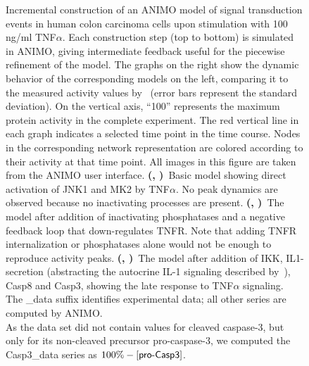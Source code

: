 \documentclass{bmcart}
\begin{document}
\begin{backmatter}
\begin{figure}[!bhtp]
\begin{tabular}{ll}
\end{tabular}
  \caption{
Incremental construction of an ANIMO model of signal transduction
events in human colon carcinoma cells upon stimulation with 100 ng/ml TNF$\alpha$.
Each construction step (top to bottom) is simulated in ANIMO, giving intermediate feedback
useful for the piecewise refinement of the model.
The graphs on the right show the dynamic behavior of the corresponding models on the left, comparing it to the measured
activity values by~\cite{pathway-compendium} (error bars represent the standard deviation).
On the vertical axis, ``100'' represents the maximum protein activity in the complete experiment.
The red vertical line in each graph indicates a selected time point in the time course. 
Nodes in the corresponding network representation are colored according to their activity at that time point.
All images in this figure are taken from the ANIMO user interface.
{\bf (\protect{}, \protect{})}~Basic model showing direct activation of JNK1 and MK2 by TNF$\alpha$.
No peak dynamics are observed because no inactivating processes are present.
{\bf (\protect{}, \protect{})}~The model after addition of inactivating phosphatases and a
negative feedback loop that down-regulates TNFR. Note that adding TNFR internalization or phosphatases alone would not be enough to reproduce activity peaks.
{\bf (\protect{}, \protect{})}~The model after addition of IKK, IL1-secretion (abstracting
the autocrine IL-1 signaling described by~\cite{pathway-autocrine}), Casp8 and Casp3, showing the late response to TNF$\alpha$ signaling.\\
The {\sf \_{}data} suffix identifies experimental data; all other series are computed by ANIMO.\\
As the data set did not contain values for cleaved caspase-3, but only for its non-cleaved precursor pro-caspase-3,
we computed the {\sf Casp3\_{}data} series as $100\% - [\mbox{\sf pro-Casp3}]$.}\label{fig:small-model}
\end{figure}



\end{backmatter}
\end{document}
